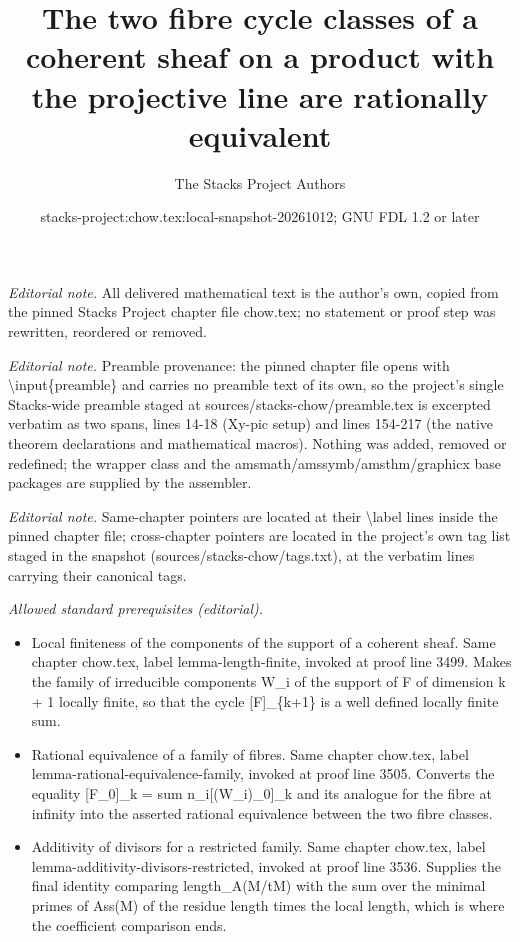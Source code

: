 \documentclass[10pt,a4paper]{amsart}
\title{The two fibre cycle classes of a coherent sheaf on a product with the projective line are rationally equivalent}
\author{The Stacks Project Authors}
\date{stacks-project:chow.tex:local-snapshot-20261012; GNU FDL 1.2 or later}
\theoremstyle{plain}
\theoremstyle{definition}
\theoremstyle{remark}
\numberwithin{equation}{subsection}
\begin{document}
\maketitle
\noindent\textit{Editorial note.} All delivered mathematical text is the author's own, copied from the pinned Stacks Project chapter file chow.tex; no statement or proof step was rewritten, reordered or removed.\par\medskip
\noindent\textit{Editorial note.} Preamble provenance: the pinned chapter file opens with \textbackslash{}input\{preamble\} and carries no preamble text of its own, so the project's single Stacks-wide preamble staged at sources/stacks-chow/preamble.tex is excerpted verbatim as two spans, lines 14-18 (Xy-pic setup) and lines 154-217 (the native theorem declarations and mathematical macros). Nothing was added, removed or redefined; the wrapper class and the amsmath/amssymb/amsthm/graphicx base packages are supplied by the assembler.\par\medskip
\noindent\textit{Editorial note.} Same-chapter pointers are located at their \textbackslash{}label lines inside the pinned chapter file; cross-chapter pointers are located in the project's own tag list staged in the snapshot (sources/stacks-chow/tags.txt), at the verbatim lines carrying their canonical tags.\par\medskip
\noindent\textit{Allowed standard prerequisites (editorial).}\begin{itemize}
\item Local finiteness of the components of the support of a coherent sheaf. Same chapter chow.tex, label lemma-length-finite, invoked at proof line 3499. Makes the family of irreducible components W\_i of the support of F of dimension k + 1 locally finite, so that the cycle [F]\_\{k+1\} is a well defined locally finite sum.
\item Rational equivalence of a family of fibres. Same chapter chow.tex, label lemma-rational-equivalence-family, invoked at proof line 3505. Converts the equality [F\_0]\_k = sum n\_i[(W\_i)\_0]\_k and its analogue for the fibre at infinity into the asserted rational equivalence between the two fibre classes.
\item Additivity of divisors for a restricted family. Same chapter chow.tex, label lemma-additivity-divisors-restricted, invoked at proof line 3536. Supplies the final identity comparing length\_A(M/tM) with the sum over the minimal primes of Ass(M) of the residue length times the local length, which is where the coefficient comparison ends.
\end{itemize}\medskip
\end{document}
